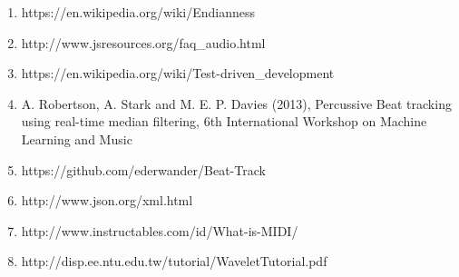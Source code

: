 \documentclass[a4paper, 11pt]{article}
\begin{document}
\begin{enumerate}
\item https://en.wikipedia.org/wiki/Endianness
\item http://www.jsresources.org/faq\_audio.html
\item https://en.wikipedia.org/wiki/Test-driven\_development
\item A. Robertson, A. Stark and M. E. P. Davies (2013), Percussive Beat tracking using real-time median filtering, 6th International Workshop on Machine Learning and Music
\item https://github.com/ederwander/Beat-Track
\item http://www.json.org/xml.html
\item http://www.instructables.com/id/What-is-MIDI/
\item http://disp.ee.ntu.edu.tw/tutorial/WaveletTutorial.pdf
\end{enumerate}
\end{document}
